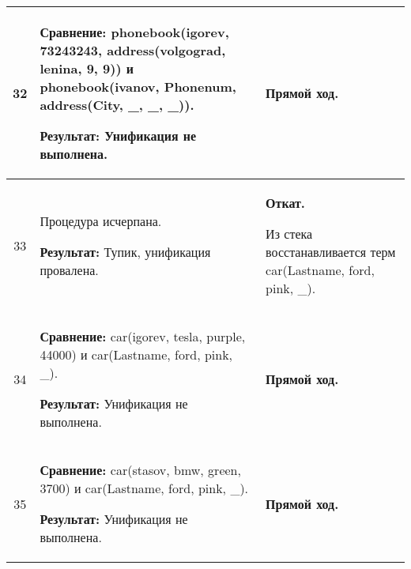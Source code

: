 \begin{longtable}{|c|p{}|p{}|}
    32
                       &
\textbf{Сравнение:} \newline
  phonebook(igorev, 73243243,
            address(volgograd, lenina,       9,  9))
    \newline и \newline
    phonebook(ivanov, Phonenum, address(City, \_, \_, \_)).
    \newline

    \textbf{Результат:} \newline
    Унификация не выполнена.
                       &
    \textbf{Прямой ход.}
                       \\ \hline

    33
                       &
    Процедура исчерпана.
    \newline

    \textbf{Результат:} \newline
    Тупик, унификация провалена.
                       &
    \textbf{Откат.}
    \newline

    Из стека восстанавливается терм \newline
    car(Lastname, ford, pink, \_).
                       \\ \hline

    34
                       &
\textbf{Сравнение:} \newline
  car(igorev, tesla,   purple, 44000)
    \newline и \newline
    car(Lastname, ford, pink, \_).
    \newline

    \textbf{Результат:} \newline
    Унификация не выполнена.
                       &
    \textbf{Прямой ход.}
                       \\ \hline

    35
                       &
\textbf{Сравнение:} \newline
  car(stasov, bmw,     green,  3700)
    \newline и \newline
    car(Lastname, ford, pink, \_).
    \newline

    \textbf{Результат:} \newline
    Унификация не выполнена.
                       &
    \textbf{Прямой ход.}
                       \\ \hline


\end{longtable}
